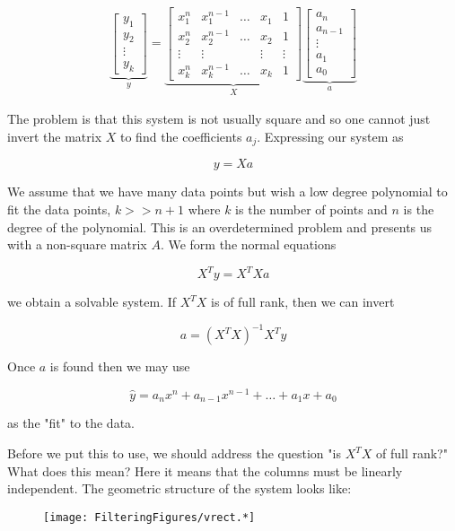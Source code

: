 \[\begin{aligned}
\underbrace{\begin{bmatrix} y_1 \\[3mm] y_2 \\[3mm] \vdots \\[3mm] y_k \end{bmatrix}}_y =
\underbrace{ \begin{bmatrix} x_1^n & x_1^{n-1} & \dots & x_1 & 1 \\[3mm]
x_2^n & x_2^{n-1} & \dots & x_2 & 1 \\[3mm]
\vdots &\vdots & & \vdots & \vdots\\[3mm]
x_k^n & x_k^{n-1} & \dots & x_k & 1
\end{bmatrix} }_X
\underbrace{\begin{bmatrix}
a_n \\[3mm] a_{n-1} \\[3mm] \vdots \\[3mm] a_1 \\[3mm] a_0
\end{bmatrix}}_a
\end{aligned}\]

The problem is that this system is not usually square and so one cannot
just invert the matrix \(X\) to find the coefficients \(a_j\).
Expressing our system as

\[y = X a\]

We assume that we have many data points but wish a low degree polynomial
to fit the data points, \(k >> n+1\) where \(k\) is the number of points
and \(n\) is the degree of the polynomial. This is an overdetermined
problem and presents us with a non-square matrix \(A\). We form the
normal equations

\[X^T y = X^TXa\]

we obtain a solvable system. If \(X^T X\) is of full rank, then we can
invert

\[a = \left(X^T X\right)^{-1} X^Ty\]

Once \(a\) is found then we may use

\[\hat{y} = a_n x^n + a_{n-1}x^{n-1} + \dots + a_1x + a_0\]

as the "fit" to the data.

Before we put this to use, we should address the question "is \(X^TX\)
of full rank?" What does this mean? Here it means that the columns must
be linearly independent. The geometric structure of the system looks
like:

\begin{figure}
\centering
\texttt{[image: FilteringFigures/vrect.*]}
\caption{}
\end{figure}

